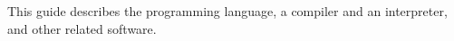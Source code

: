 

This guide describes the \asharp{} programming language,
a compiler and an interpreter, and other related software.

